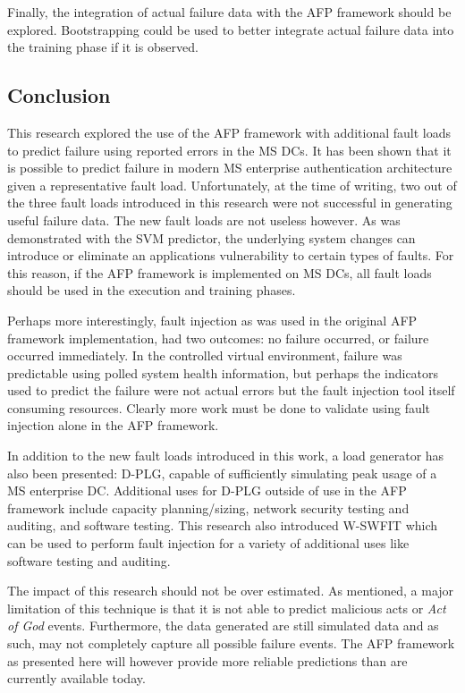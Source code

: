 Finally, the integration of actual failure data with the \ac{AFP} framework
should be explored.  Bootstrapping could be used to better integrate actual
failure data into the training phase if it is observed. 

\subsection{Conclusion}
This research explored the use of the \ac{AFP} framework with additional fault
loads to predict failure using reported errors in the \ac{MS} \ac{DC}s.  It has
been shown that it is possible to predict failure in modern \ac{MS} enterprise
authentication architecture given a representative fault load.  Unfortunately,
at the time of writing, two out of the three fault loads introduced in this
research were not successful in generating useful failure data.  The new fault
loads are not useless however.  As was demonstrated with the \ac{SVM}
predictor, the underlying system changes can introduce or eliminate an
applications vulnerability to certain types of faults.  For this reason, if the
\ac{AFP} framework is implemented on \ac{MS} \ac{DC}s, all fault loads should
be used in the execution and training phases.

Perhaps more interestingly, fault injection as was used in the original
\ac{AFP} framework implementation, had two outcomes: no failure occurred, or
failure occurred immediately.  In the controlled virtual environment, failure
was predictable using polled system health information, but perhaps the
indicators used to predict the failure were not actual errors but the fault
injection tool itself consuming resources.  Clearly more work must be done to
validate using fault injection alone in the \ac{AFP} framework.

In addition to the new fault loads introduced in this work, a load generator
has also been presented:  \ac{D-PLG}, capable of sufficiently simulating peak
usage of a \ac{MS} enterprise \ac{DC}.  Additional uses for \ac{D-PLG} outside
of use in the \ac{AFP} framework include capacity planning/sizing, network
security testing and auditing, and software testing.  This research also
introduced \ac{W-SWFIT} which can be used to perform fault injection for a
variety of additional uses like software testing and auditing.

The impact of this research should not be over estimated.  As mentioned, a
major limitation of this technique is that it is not able to predict malicious
acts or \emph{Act of God} events.  Furthermore, the data generated are still
simulated data and as such, may not completely capture all possible failure
events.  The \ac{AFP} framework as presented here will however provide more
reliable predictions than are currently available today.

